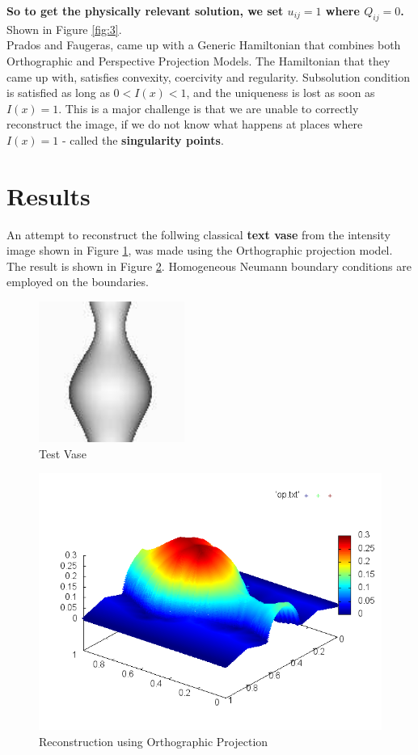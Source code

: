 \documentclass[11pt]{article}
\begin{document}
	\noindent
\textbf{So to get the physically relevant solution, we set $u_{ij} = 1$ where $Q_{ij} = 0$.} Shown in Figure \ref{fig:3}.\\
	
	\noindent
	Prados and Faugeras\cite{prados}, came up with a Generic Hamiltonian that combines both Orthographic and Perspective Projection Models. The Hamiltonian that they came up with, satisfies convexity, coercivity and regularity.  Subsolution condition is satisfied as long as $0<I(x)<1$, and the uniqueness is lost as soon as $I(x) = 1$. This is a major challenge is that we are unable to correctly reconstruct the image, if we do not know what happens at places where $I(x) = 1$ - called the \textbf{singularity points}.
	
	\section{Results}
	An attempt to reconstruct the follwing classical \textbf{text vase} from the intensity image shown in Figure \ref{fig:4}, was made using the Orthographic projection model. The result is shown in Figure \ref{fig:5}. Homogeneous Neumann boundary conditions are employed on the boundaries.
		\pagebreak
	\begin{figure}[h!]
		\centering
		\includegraphics[scale = 1.5]{vase.png}
		\caption{Test Vase}
		\label{fig:4}
	\end{figure}
	\begin{figure}[h!]
		\centering
			\includegraphics[scale = 0.8]{vase_gnuplot.png}
			\caption{Reconstruction using Orthographic Projection}
			\label{fig:5}
	\end{figure}
		\pagebreak
	\nocite{*}
	
	
\end{document}
